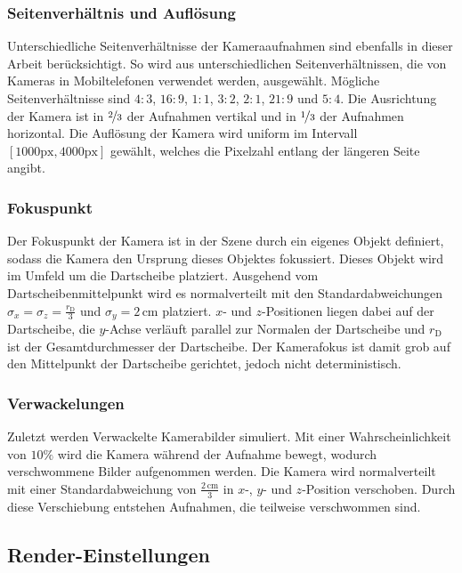 \subsubsection{Seitenverhältnis und Auflösung}

Unterschiedliche Seitenverhältnisse der Kameraaufnahmen sind ebenfalls in dieser Arbeit berücksichtigt. So wird aus unterschiedlichen Seitenverhältnissen, die von Kameras in Mobiltelefonen verwendet werden, ausgewählt. Mögliche Seitenverhältnisse sind $4:3$, $16:9$, $1:1$, $3:2$, $2:1$, $21:9$ und $5:4$. Die Ausrichtung der Kamera ist in $\nicefrac{2}{3}$ der Aufnahmen vertikal und in $\nicefrac{1}{3}$ der Aufnahmen horizontal. Die Auflösung der Kamera wird uniform im Intervall $[1000\text{px}, 4000\text{px}]$ gewählt, welches die Pixelzahl entlang der längeren Seite angibt.

\subsubsection{Fokuspunkt}

Der Fokuspunkt der Kamera ist in der Szene durch ein eigenes Objekt definiert, sodass die Kamera den Ursprung dieses Objektes fokussiert. Dieses Objekt wird im Umfeld um die Dartscheibe platziert. Ausgehend vom Dartscheibenmittelpunkt wird es normalverteilt mit den Standardabweichungen $\sigma_x = \sigma_z = \frac{r_\text{D}}{3}$ und $\sigma_y = 2\,\text{cm}$ platziert. $x$- und $z$-Positionen liegen dabei auf der Dartscheibe, die $y$-Achse verläuft parallel zur Normalen der Dartscheibe und $r_\text{D}$ ist der Gesamtdurchmesser der Dartscheibe. Der Kamerafokus ist damit grob auf den Mittelpunkt der Dartscheibe gerichtet, jedoch nicht deterministisch.

\subsubsection{Verwackelungen}

Zuletzt werden Verwackelte Kamerabilder simuliert. Mit einer Wahrscheinlichkeit von $10\%$ wird die Kamera während der Aufnahme bewegt, wodurch verschwommene Bilder aufgenommen werden. Die Kamera wird normalverteilt mit einer Standardabweichung von $\frac{2\,\text{cm}}{3}$ in $x$-, $y$- und $z$-Position verschoben. Durch diese Verschiebung entstehen Aufnahmen, die teilweise verschwommen sind.

\subsection{Render-Einstellungen}  %
\label{sec:render_einstellungen}

